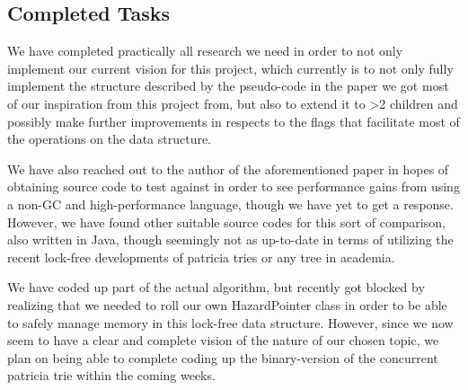 \documentclass[conference]{IEEEtran}
\begin{document}
\subsection{Completed Tasks}
We have completed practically all research we need in order to not only implement our current vision for this project, which currently is to not only fully implement the structure described by the pseudo-code in the paper we got most of our inspiration from this project from\cite{Shafiei2013}, but also to extend it to >2 children and possibly make further improvements in respects to the flags that facilitate most of the operations on the data structure.
\par
We have also reached out to the author of the aforementioned paper in hopes of obtaining source code to test against in order to see performance gains from using a non-GC and high-performance language, though we have yet to get a response. However, we have found other suitable source codes for this sort of comparison, also written in Java, though seemingly not as up-to-date in terms of utilizing the recent lock-free developments of patricia tries or any tree in academia.\cite{PATSource}
\par
We have coded up part of the actual algorithm, but recently got blocked by realizing that we needed to roll our own HazardPointer class in order to be able to safely manage memory in this lock-free data structure. However, since we now seem to have a clear and complete vision of the nature of our chosen topic, we plan on being able to complete coding up the binary-version of the concurrent patricia trie within the coming weeks.
\par
\end{document}
